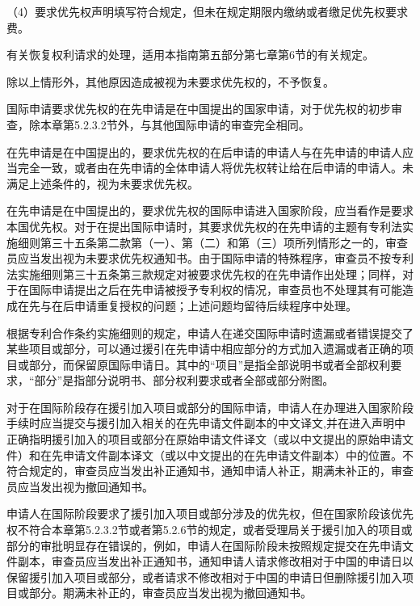 {\setlength{\parindent}{17.8bp}（4）要求优先权声明填写符合规定，但未在规定期限内缴纳或者缴足优先权要求费。\par}

有关恢复权利请求的处理，适用本指南第五部分第七章第6节的有关规定。

除以上情形外，其他原因造成被视为未要求优先权的，不予恢复。

国际申请要求优先权的在先申请是在中国提出的国家申请，对于优先权的初步审查，除本章第5.2.3.2节外，与其他国际申请的审查完全相同。

在先申请是在中国提出的，要求优先权的在后申请的申请人与在先申请的申请人应当完全一致，或者由在先申请的全体申请人将优先权转让给在后申请的申请人。未满足上述条件的，视为未要求优先权。

在先申请是在中国提出的，要求优先权的国际申请进入国家阶段，应当看作是要求本国优先权。对于在提出国际申请时，其要求优先权的在先申请的主题有专利法实施细则第三十五条第二款第（一）、第（二）和第（三）项所列情形之一的，审查员应当发出视为未要求优先权通知书。由于国际申请的特殊程序，审查员不按专利法实施细则第三十五条第三款规定对被要求优先权的在先申请作出处理；同样，对于在国际申请提出之后在先申请被授予专利权的情况，审查员也不处理其有可能造成在先与在后申请重复授权的问题；上述问题均留待后续程序中处理。

根据专利合作条约实施细则的规定，申请人在递交国际申请时遗漏或者错误提交了某些项目或部分，可以通过援引在先申请中相应部分的方式加入遗漏或者正确的项目或部分，而保留原国际申请日。其中的“项目”是指全部说明书或者全部权利要求，“部分”是指部分说明书、部分权利要求或者全部或部分附图。

对于在国际阶段存在援引加入项目或部分的国际申请，申请人在办理进入国家阶段手续时应当提交与援引加入相关的在先申请文件副本的中文译文,并在进入声明中正确指明援引加入的项目或部分在原始申请文件译文（或以中文提出的原始申请文件）和在先申请文件副本译文（或以中文提出的在先申请文件副本）中的位置。不符合规定的，审查员应当发出补正通知书，通知申请人补正，期满未补正的，审查员应当发出视为撤回通知书。

申请人在国际阶段要求了援引加入项目或部分涉及的优先权，但在国家阶段该优先权不符合本章第5.2.3.2节或者第5.2.6节的规定，或者受理局关于援引加入的项目或部分的审批明显存在错误的，例如，申请人在国际阶段未按照规定提交在先申请文件副本，审查员应当发出补正通知书，通知申请人请求修改相对于中国的申请日以保留援引加入项目或部分，或者请求不修改相对于中国的申请日但删除援引加入项目或部分。期满未补正的，审查员应当发出视为撤回通知书。

